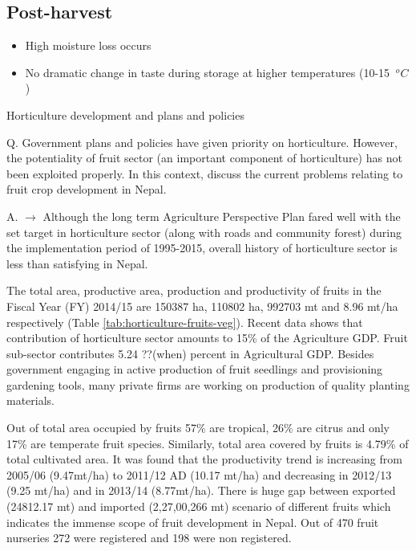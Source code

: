 \documentclass[
]{book}
\providecommand{\tightlist}{%
  \setlength{\itemsep}{0pt}\setlength{\parskip}{0pt}}
\begin{document}
\hypertarget{post-harvest}{%
\subsection{Post-harvest}\label{post-harvest}}

\begin{itemize}
\tightlist
\item
  High moisture loss occurs
\item
  No dramatic change in taste during storage at higher temperatures (10-15 \(\ ^o C\))
\end{itemize}

Horticulture development and plans and policies

Q. Government plans and policies have given priority on horticulture. However, the potentiality of fruit sector (an important component of horticulture) has not been exploited properly. In this context, discuss the current problems relating to fruit crop development in Nepal.

A. \(\longrightarrow\) Although the long term Agriculture Perspective Plan fared well with the set target in horticulture sector (along with roads and community forest) during the implementation period of 1995-2015, overall history of horticulture sector is less than satisfying in Nepal.

The total area, productive area, production and productivity of fruits in the Fiscal Year (FY) 2014/15 are 150387 ha, 110802 ha, 992703 mt and 8.96 mt/ha respectively (Table \ref{tab:horticulture-fruits-veg}). Recent data shows that contribution of horticulture sector amounts to 15\% of the Agriculture GDP. Fruit sub-sector contributes 5.24 ??(when) percent in Agricultural GDP. Besides government engaging in active production of fruit seedlings and provisioning gardening tools, many private firms are working on production of quality planting materials.

Out of total area occupied by fruits 57\% are tropical, 26\% are citrus and only 17\% are temperate fruit species. Similarly, total area covered by fruits is 4.79\% of total cultivated area. It was found that the productivity trend is increasing from 2005/06 (9.47mt/ha) to 2011/12 AD (10.17 mt/ha) and decreasing in 2012/13 (9.25 mt/ha) and in 2013/14 (8.77mt/ha). There is huge gap between exported (24812.17 mt) and imported (2,27,00,266 mt) scenario of different fruits which indicates the immense scope of fruit development in Nepal. Out of 470 fruit nurseries 272 were registered and 198 were non registered.
\end{document}

